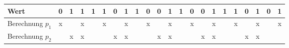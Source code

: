\begin{sidewaystable}
\begin{tabular}{|p{2.3cm}|c|c|c|c|c|c|c|c|c|c|c|c|c|c|c|c|c|c|c|c|c|}
        \hline
        Wert                  & 0                                          & 1                                          & 1                                          & 1                                          & 1                                          & 0                                          & 1                                          & 1                                          & 0                                          & 0                                          & 1                                          & 1                                          & 0                                          & 0                                          & 1                                          & 1                                          & 1                                          & 0                                          & 1                                          & 0                                          & 1                                          \\
        \hline
        Berechnung $p_1$      & x                                          &                                            & x                                          &                                            & x                                          &                                            & x                                          &                                            & x                                          &                                            & x                                          &                                            & x                                          &                                            & x                                          &                                            & x                                          &                                            & x                                          &                                            & x                                          \\
        \hline 
        Berechnung $p_2$      &                                            & x                                          & x                                          &                                            &                                            & x                                          & x                                          &                                            &                                            & x                                          & x                                          &                                            &                                            & x                                          & x                                          &                                            &                                            & x                                          & x                                          &                                            &                                            \\

\end{tabular}
\end{sidewaystable}
